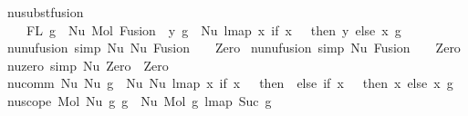 \begin{isabellebody}
{\isacharbar}{\kern0pt}\ nu{\isacharunderscore}{\kern0pt}subst{\isacharunderscore}{\kern0pt}fusion{}{\isacharcolon}{\kern0pt}\isanewline
\ \ {\isachardoublequoteopen}{}\ {\isasymin}\ FL\ g\ {\isacharequal}{\kern0pt}{\isacharequal}{\kern0pt}{\isachargreater}{\kern0pt}\ Nu\ {\isacharparenleft}{\kern0pt}Mol\ {\isacharparenleft}{\kern0pt}Fusion\ {}\ y{\isacharparenright}{\kern0pt}\ g{\isacharparenright}{\kern0pt}\ {\isasymsimeq}\ Nu\ {\isacharparenleft}{\kern0pt}lmap\ {\isacharparenleft}{\kern0pt}{\isasymlambda}x{\isachardot}{\kern0pt}\ if\ x\ {\isacharequal}{\kern0pt}\ {}\ then\ y\ else\ x{\isacharparenright}{\kern0pt}\ g{\isacharparenright}{\kern0pt}{\isachardoublequoteclose}\isanewline
\isanewline
\isanewline
{\isacharbar}{\kern0pt}\ nu{\isacharunderscore}{\kern0pt}nu{\isacharunderscore}{\kern0pt}fusion{}\ {\isacharbrackleft}{\kern0pt}simp{\isacharbrackright}{\kern0pt}{\isacharcolon}{\kern0pt}\ {\isachardoublequoteopen}Nu\ {\isacharparenleft}{\kern0pt}Nu\ {\isacharparenleft}{\kern0pt}Fusion\ {}\ {}{\isacharparenright}{\kern0pt}{\isacharparenright}{\kern0pt}\ {\isasymsimeq}\ Zero{\isachardoublequoteclose}\isanewline
{\isacharbar}{\kern0pt}\ nu{\isacharunderscore}{\kern0pt}nu{\isacharunderscore}{\kern0pt}fusion{}\ {\isacharbrackleft}{\kern0pt}simp{\isacharbrackright}{\kern0pt}{\isacharcolon}{\kern0pt}\ {\isachardoublequoteopen}Nu\ {\isacharparenleft}{\kern0pt}Fusion\ {}\ {}{\isacharparenright}{\kern0pt}\ {\isasymsimeq}\ Zero{\isachardoublequoteclose}\isanewline
\isanewline
\isanewline
{\isacharbar}{\kern0pt}\ nu{\isacharunderscore}{\kern0pt}zero\ {\isacharbrackleft}{\kern0pt}simp{\isacharbrackright}{\kern0pt}{\isacharcolon}{\kern0pt}\ {\isachardoublequoteopen}Nu\ Zero\ {\isasymsimeq}\ Zero{\isachardoublequoteclose}\isanewline
\isanewline
\isanewline
{\isacharbar}{\kern0pt}\ nu{\isacharunderscore}{\kern0pt}comm{\isacharcolon}{\kern0pt}\ {\isachardoublequoteopen}Nu\ {\isacharparenleft}{\kern0pt}Nu\ g{\isacharparenright}{\kern0pt}\ {\isasymsimeq}\ Nu\ {\isacharparenleft}{\kern0pt}Nu\ {\isacharparenleft}{\kern0pt}lmap\ {\isacharparenleft}{\kern0pt}{\isasymlambda}x{\isachardot}{\kern0pt}\ if\ x\ {\isacharequal}{\kern0pt}\ {}\ then\ {}\ else\ if\ x\ {\isacharequal}{\kern0pt}\ {}\ then\ x\ else\ x{\isacharparenright}{\kern0pt}\ g{\isacharparenright}{\kern0pt}{\isacharparenright}{\kern0pt}{\isachardoublequoteclose}\isanewline
\isanewline
\isanewline
{\isacharbar}{\kern0pt}\ nu{\isacharunderscore}{\kern0pt}scope{\isacharcolon}{\kern0pt}\ {\isachardoublequoteopen}Mol\ {\isacharparenleft}{\kern0pt}Nu\ g{}{\isacharparenright}{\kern0pt}\ g{}\ {\isasymsimeq}\ Nu\ {\isacharparenleft}{\kern0pt}Mol\ g{}\ {\isacharparenleft}{\kern0pt}lmap\ Suc\ g{}{\isacharparenright}{\kern0pt}{\isacharparenright}{\kern0pt}{\isachardoublequoteclose}%

\end{isabellebody}
